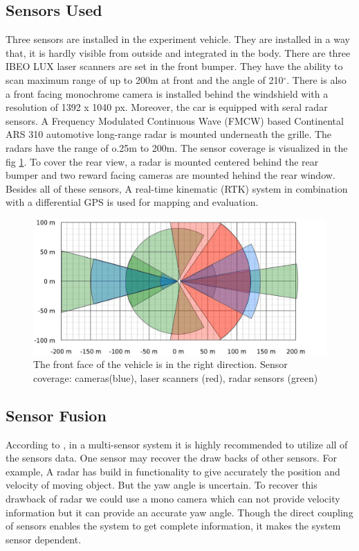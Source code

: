 \subsection{Sensors Used}
Three sensors are installed in the experiment vehicle. They are installed in a way that, it is hardly visible from outside and integrated in the body. There are three IBEO LUX laser scanners are set in the front bumper. They have the ability to scan maximum range of up to 200m at front and the angle of 210$^{\circ}$. There is also a front facing monochrome camera is installed behind the windshield with a resolution of 1392 x 1040 px. Moreover, the car is equipped with seral radar sensors. A Frequency Modulated Continuous Wave (FMCW) based Continental ARS 310 automotive long-range radar is mounted underneath the grille\cite{Kunz_2015}. The radars have the range of o.25m to 200m. The sensor coverage is visualized in the fig \ref{fig:sensor_covarage_Independent}. To cover the rear view, a radar is mounted centered behind the rear bumper and two reward facing cameras are mounted hehind the rear window. Besides all of these sensors, A real-time kinematic (RTK) system in combination with a differential GPS is used for mapping and evaluation\cite{Kunz_2015}.
\begin{figure}
  \centering
  \includegraphics[width=.6\textwidth]{src/pic/sensor_covarage_Independent.png}
  \caption{The front face of the vehicle is in the right direction.  Sensor coverage: cameras(blue), laser scanners (red), radar sensors (green) \cite{Kunz_2015}}
  \label{fig:sensor_covarage_Independent}
\end{figure}
\subsection{Sensor Fusion}
According to \cite{Kunz_2015}, in a multi-sensor system it is highly recommended to utilize all of the sensors data. One sensor may recover the draw backs of other sensors. For example, A radar has build in functionality to give accurately the position and velocity of moving object. But the yaw angle is uncertain. To recover this drawback of radar we could use a mono camera which can not provide velocity information but it can provide an accurate yaw angle. Though the direct coupling of sensors enables the system to get complete information, it makes the system sensor dependent\cite{Kunz_2015}.


